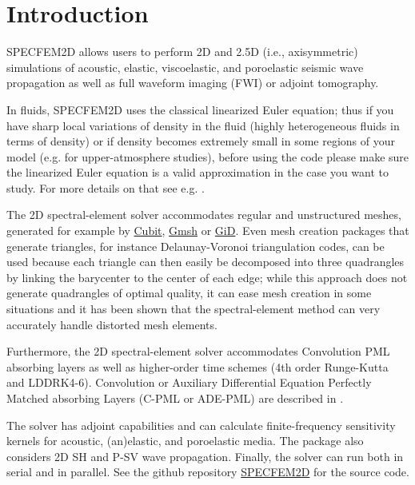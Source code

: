 
\chapter{Introduction}


SPECFEM2D allows users to perform 2D and 2.5D (i.e., axisymmetric) simulations of
acoustic, elastic, viscoelastic, and poroelastic seismic wave propagation
as well as full waveform imaging (FWI) or adjoint tomography.\newline

In fluids,
SPECFEM2D uses the classical linearized Euler equation; thus if you have sharp local variations of density in the fluid (highly heterogeneous fluids
in terms of density) or if density becomes extremely small in some regions of your model (e.g. for upper-atmosphere studies), before using the code please make sure the linearized Euler equation is a valid approximation in the case you want to study. For more details on that see e.g. \cite{COA2011}.\newline

The 2D spectral-element solver accommodates
regular and unstructured meshes, generated for example by \href{https://cubit.sandia.gov}{Cubit},
\href{http://gmsh.info}{Gmsh} or \href{https://www.gidsimulation.com}{GiD}.
Even mesh creation packages that generate triangles, for instance Delaunay-Voronoi triangulation codes, can be used because each triangle can then easily be decomposed into three quadrangles by linking the barycenter to the center of each edge; while this approach does not generate quadrangles of optimal quality, it can ease mesh creation in some situations and it has been shown that the spectral-element method can very accurately handle distorted mesh elements.\newline

Furthermore, the 2D spectral-element solver accommodates Convolution PML absorbing layers as well as higher-order time schemes
(4th order Runge-Kutta and LDDRK4-6).
Convolution or Auxiliary Differential Equation Perfectly Matched absorbing Layers (C-PML or ADE-PML)
are described in \cite{MaKoEz08,MaKoGe08,MaKo09,MaKoGeBr10,KoMa07}.\newline

The solver has adjoint capabilities and can
calculate finite-frequency sensitivity kernels \citep{TrKoLi08,PeKoLuMaLeCaLeMaLiBlNiBaTr11} for acoustic,
(an)elastic, and poroelastic media. The package also considers 2D SH
and P-SV wave propagation. Finally, the solver can run
both in serial and in parallel.
See the github repository \href{https://github.com/SPECFEM/specfem2d}{SPECFEM2D} for the source code.\newline

